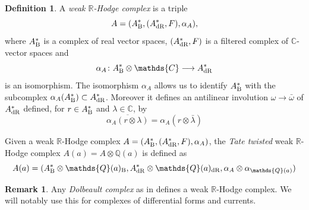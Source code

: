 \documentclass[11pt,a4paper]{amsart}
\newcommand{\Betti}{\text{\rm B}}
\newcommand{\dR}{\text{\rm dR}}
\newcommand{\C}{\mathds{C}}
\newcommand{\Q}{\mathds{Q}}
\newcommand{\R}{\mathds{R}}
\numberwithin{equation}{section}
\theoremstyle{plain}
\theoremstyle{definition}
\newtheorem{df}[prop]{Definition}
\newtheorem{rmk}[prop]{Remark}
\begin{document}
\begin{df}\label{def:1} A \emph{weak $\R$-Hodge complex} is a triple
  \begin{displaymath}
    A=(A^{\ast}_{\Betti},(A^{\ast}_{\dR},F),\alpha _{A}),
  \end{displaymath}
  where $A^{\ast}_{\Betti}$ is a complex of real vector spaces,
  $(A^{\ast}_{\dR},F)$ is a filtered complex of $\C$-vector spaces and
  \begin{displaymath}
    \alpha _{A}\colon A^{\ast}_{\Betti}\otimes \C \longrightarrow A^{\ast}_{\dR}
  \end{displaymath}
  is an isomorphism. The isomorphism $\alpha _{A}$ allows us to
  identify $A^{\ast}_{\Betti}$ with the subcomplex $\alpha
  _{A}(A^{\ast}_{\Betti})\subset A^{\ast}_{\dR}$. Moreover it defines an antilinear
  involution $\omega \to \bar \omega$ of $A^{\ast}_{\dR}$ defined, for
  $r\in A^{\ast}_{\Betti}$ and $\lambda \in \C$, by
  \begin{displaymath}
    \overline{\alpha _{A}(r\otimes \lambda)}=\alpha _{A}(r\otimes \bar \lambda )
  \end{displaymath}

  Given a weak $\R$-Hodge complex $A=(A^{\ast}_{\Betti},(A^{\ast}_{\dR},F),\alpha _{A})$, the
  \emph{Tate
    twisted} weak $\R$-Hodge complex
  $A(a)=A\otimes \Q(a)$ is defined as
  \begin{displaymath}
    A(a)=(A^{\ast}_{\Betti}\otimes \Q(a)_{\Betti}, A^{\ast}_{\dR}\otimes
    \Q(a)_{\dR},\alpha _{A}\otimes \alpha _{\Q(a)})
  \end{displaymath}
\end{df}

\begin{rmk}\label{rem:2.4}
  Any \emph{Dolbeault complex} as in \cite[Definition
2.2]{Burgos:CDB} defines a weak $\R$-Hodge complex. We will notably
use this for complexes of differential forms and currents.
\end{rmk}
\end{document}
